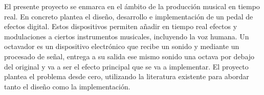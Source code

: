El presente proyecto se enmarca en el ámbito de la producción musical en tiempo real. En concreto plantea el diseño, desarrollo e implementación de un pedal de efectos digital. Estos dispositivos permiten añadir en tiempo real efectos y modulaciones a ciertos instrumentos musicales, incluyendo la voz humana. Un octavador es un dispositivo electrónico que recibe un sonido y mediante un procesado de señal, entrega a su salida ese mismo sonido una octava por debajo del original y va a ser el efecto principal que se va a implementar. El proyecto plantea el problema desde cero, utilizando la literatura existente para abordar tanto el diseño como la implementación.
